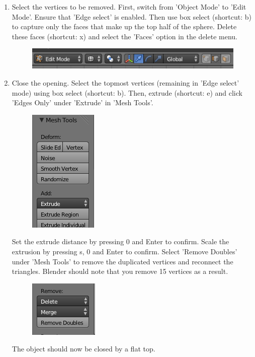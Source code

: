 \documentclass[twoside,a4paper]{refart}
\begin{document}
\begin{enumerate}
\item   Select the vertices to be removed. First, switch from 'Object Mode' to 'Edit Mode'. Ensure that 'Edge select' is enabled. Then use box select (shortcut: b) to capture only the faces that make up the top half of the sphere. Delete these faces (shortcut: x) and select the 'Faces' option in the delete menu.
        \begin{figure}[H]
        \includegraphics[scale=0.5]{spinehead3.png}
        \end{figure}

\item   Close the opening. Select the topmost vertices (remaining in 'Edge select' mode) using box select (shortcut: b). Then, extrude (shortcut: e) and click 'Edges Only' under 'Extrude' in 'Mesh Tools'.        
        \begin{figure}[H]
        \includegraphics[scale=0.5]{spinehead4.png}
        \end{figure}
        Set the extrude distance by pressing 0 and Enter to confirm. Scale the extrusion by pressing s, 0 and Enter to confirm. Select 'Remove Doubles' under 'Mesh Tools' to remove the duplicated vertices and reconnect the triangles. Blender should note that you remove 15 vertices as a result.
        \begin{figure}[H]
        \includegraphics[scale=0.5]{spinehead5.png}
        \end{figure}
        The object should now be closed by a flat top.

\end{enumerate}
\end{document}
